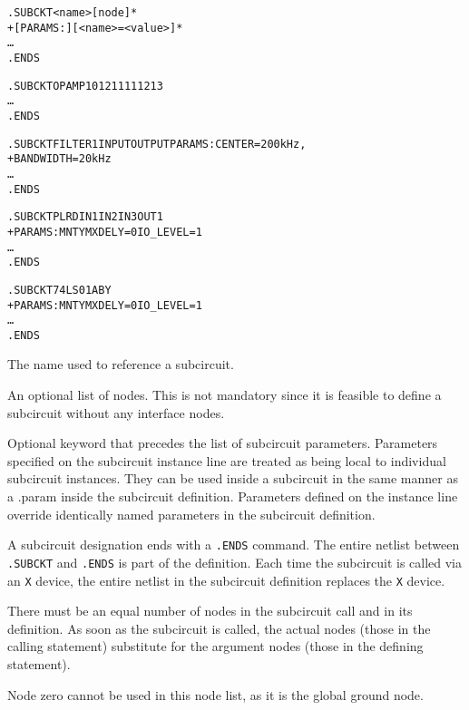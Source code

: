 \begin{Command}

\format
\begin{alltt}
.SUBCKT <name> [node]*
+ [PARAMS:] [<name>=<value>]* 
\ldots
.ENDS
\end{alltt}

\examples
\begin{alltt}
.SUBCKT OPAMP 10 12 111 112 13
\ldots
.ENDS

.SUBCKT FILTER1 INPUT OUTPUT PARAMS: CENTER=200kHz,
+ BANDWIDTH=20kHz
\ldots
.ENDS

.SUBCKT PLRD IN1 IN2 IN3 OUT1
+ PARAMS: MNTYMXDELY=0 IO_LEVEL=1
\ldots
.ENDS

.SUBCKT 74LS01 A B Y
+ PARAMS: MNTYMXDELY=0 IO_LEVEL=1
\ldots
.ENDS
\end{alltt}

\arguments

\begin{Arguments}
The  name used to reference a subcircuit.

An optional list of nodes. This is not mandatory since it is
feasible to define a subcircuit without any interface nodes.

Optional keyword that precedes the list of subcircuit parameters.
Parameters specified on the subcircuit instance line are treated as
being local to individual subcircuit instances.  
They can be used inside a subcircuit in the same manner as a .param inside the subcircuit definition.
Parameters defined on the instance line override identically named parameters in the subcircuit definition.

\end{Arguments}

\comments
A subcircuit  designation ends with a
\texttt{.ENDS} command. The entire netlist between \texttt{.SUBCKT} and
\texttt{.ENDS} is part of the definition. Each time the subcircuit is called
via an \texttt{X} device, the entire netlist in the subcircuit definition
replaces the \texttt{X} device.

There must be an equal number of nodes in the subcircuit call and in its
definition.  As soon as the subcircuit is called, the actual nodes (those in
the calling statement) substitute for the argument nodes (those in the
defining statement).

Node zero cannot be used in this node list, as
it is the global ground node.


\end{Command}
